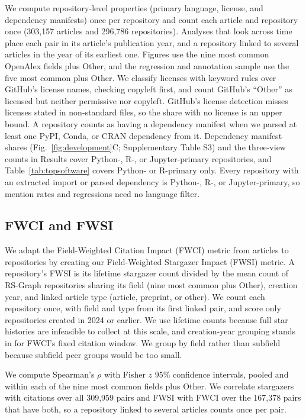\documentclass[pdflatex,sn-nature]{sn-jnl}%
\begin{document}
We compute repository-level properties (primary language, license, and dependency manifests) once per repository and count each article and repository once (303,157 articles and 296,786 repositories).
Analyses that look across time place each pair in its article's publication year, and a repository linked to several articles in the year of its earliest one.
Figures use the nine most common OpenAlex fields plus Other, and the regression and annotation sample use the five most common plus Other.
We classify licenses with keyword rules over GitHub's license names, checking copyleft first, and count GitHub's ``Other'' as licensed but neither permissive nor copyleft.
GitHub's license detection misses licenses stated in non-standard files, so the share with no license is an upper bound.
A repository counts as having a dependency manifest when we parsed at least one PyPI, Conda, or CRAN dependency from it.
Dependency manifest shares (Fig.~\ref{fig:development}C; Supplementary Table S3) and the three-view counts in Results cover Python-, R-, or Jupyter-primary repositories, and Table~\ref{tab:topsoftware} covers Python- or R-primary only.
Every repository with an extracted import or parsed dependency is Python-, R-, or Jupyter-primary, so mention rates and regressions need no language filter.

\subsection{FWCI and FWSI}\label{subsec:m-fwsi}

We adapt the Field-Weighted Citation Impact (FWCI) metric from articles to repositories by creating our Field-Weighted Stargazer Impact (FWSI) metric.
A repository's FWSI is its lifetime stargazer count divided by the mean count of RS-Graph repositories sharing its field (nine most common plus Other), creation year, and linked article type (article, preprint, or other).
We count each repository once, with field and type from its first linked pair, and score only repositories created in 2024 or earlier.
We use lifetime counts because full star histories are infeasible to collect at this scale, and creation-year grouping stands in for FWCI's fixed citation window.
We group by field rather than subfield because subfield peer groups would be too small.

We compute Spearman's $\rho$ with Fisher $z$ 95\% confidence intervals, pooled and within each of the nine most common fields plus Other.
We correlate stargazers with citations over all 309,959 pairs and FWSI with FWCI over the 167,378 pairs that have both, so a repository linked to several articles counts once per pair.
\end{document}
